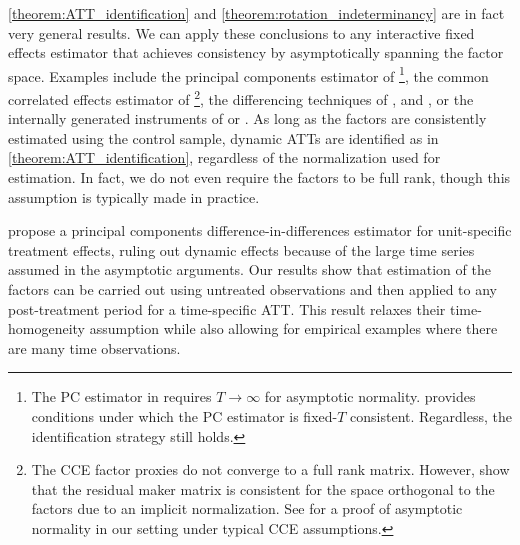 \documentclass[12pt]{article}
\begin{document}
\autoref{theorem:ATT_identification} and \autoref{theorem:rotation_indeterminancy} are in fact very general results. We can apply these conclusions to any interactive fixed effects estimator that achieves consistency by asymptotically spanning the factor space. Examples include the principal components estimator of \citet{Bai_2009}\footnote{The PC estimator in \citet{Bai_2009} requires $T \rightarrow \infty$ for asymptotic normality. \citet{Westerlund_2020} provides conditions under which the PC estimator is fixed-$T$ consistent. Regardless, the identification strategy still holds.}, the common correlated effects estimator of \citet{pesaran2006estimation}\footnote{The CCE factor proxies do not converge to a full rank matrix. However, \citet{Westerlund_Petrova_Norkute_2019} show that the residual maker matrix is consistent for the space orthogonal to the factors due to an implicit normalization. See \citet{Brown_Butts_Westerlund_2023} for a proof of asymptotic normality in our setting under typical CCE assumptions.}, the differencing techniques of \citet{Ahn_Lee_Schmidt_2001,Ahn_Lee_Schmidt_2013}, \citet{Callaway_Karami_2020} and \citet{Brown_2022}, or the internally generated instruments of \citet{Juodis_Sarafidis_2022} or \citet{Cui_et_al_2022}. As long as the factors are consistently estimated using the control sample, dynamic ATTs are identified as in \autoref{theorem:ATT_identification}, regardless of the normalization used for estimation. In fact, we do not even require the factors to be full rank, though this assumption is typically made in practice. 

\citet{Chan_and_Kwok_2022} propose a principal components difference-in-differences estimator for unit-specific treatment effects, ruling out dynamic effects because of the large time series assumed in the asymptotic arguments. Our results show that estimation of the factors can be carried out using untreated observations and then applied to any post-treatment period for a time-specific ATT. This result relaxes their time-homogeneity assumption while also allowing for empirical examples where there are many time observations.
\end{document}
